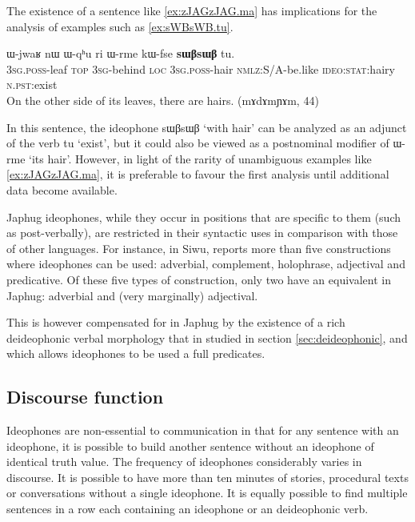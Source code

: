 \documentclass[oldfontcommands,oneside,a4paper,11pt]{article}
\newcommand{\ipa}[1]{{\phon \mbox{#1}}} %
\begin{document}
The existence of a sentence like \ref{ex:zJAGzJAG.ma}  has implications for the analysis of examples such as \ref{ex:sWBsWB.tu}.
    \begin{exe}
\ex \label{ex:sWBsWB.tu}
\gll 
   \ipa{ɯ-jwaʁ} 	\ipa{nɯ} 	\ipa{ɯ-qʰu} 	\ipa{ri} 	\ipa{ɯ-rme} 	\ipa{kɯ-fse} 	\ipa{\textbf{sɯβsɯβ}} 	\ipa{tu.} \\
   \textsc{3sg.poss}-leaf \textsc{top} \textsc{3sg}-behind \textsc{loc}    \textsc{3sg.poss}-hair \textsc{nmlz}:S/A-be.like \textsc{ideo:stat}:hairy \textsc{n.pst}:exist    \\
\glt On the other side of its leaves, there are hairs. (mɤdɤmɲɤm, 44)
\end{exe}

In this sentence, the ideophone \ipa{sɯβsɯβ}  `with hair' can be analyzed as an adjunct of the verb \ipa{tu} `exist', but it could also be viewed as a postnominal modifier of 	\ipa{ɯ-rme}  `its hair'. However, in light of the rarity of unambiguous examples like \ref{ex:zJAGzJAG.ma}, it is preferable to favour the first analysis until additional data become available.
 


Japhug ideophones, while they occur in positions that are specific to them (such as post-verbally), are  restricted in their syntactic uses in comparison with those of other languages. For instance, in Siwu, \citet{dingemanse14} reports more than five constructions where ideophones can be used: adverbial, complement, holophrase, adjectival and predicative. Of these five types of construction, only two have an equivalent in Japhug: adverbial and (very marginally) adjectival. 

This is however compensated  for in Japhug by the existence of a rich deideophonic verbal morphology that in studied in section \ref{sec:deideophonic}, and which allows ideophones to be used a full predicates.

\subsection{Discourse function}
  Ideophones are  non-essential to communication in that for any sentence with an ideophone, it is possible to build another sentence without an ideophone of identical truth value. The frequency of ideophones considerably varies  in discourse. It is possible to have more than ten minutes of stories, procedural texts or conversations without a single ideophone. It is equally possible to find  multiple sentences in a row each containing an ideophone or an deideophonic verb.
  
\end{document}
